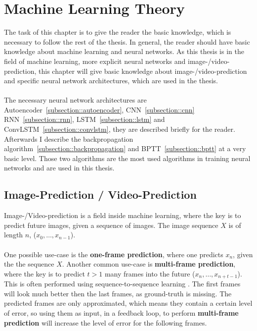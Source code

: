 \section{Machine Learning Theory} \label{section::theory}
 The task of this chapter is to give the reader the basic knowledge, which is necessary to follow the rest of the thesis. In general, the reader should have basic 
 knowledge about machine learning and neural networks.
 As this thesis is in the field of machine learning, more explicit neural networks and image-/video-prediction, this chapter will give basic knowledge about 
 image-/video-prediction
 and specific neural network architectures, which are used in the thesis.\\\\
 The necessary neural network architectures are Autoencoder~\ref{subsection::autoencoder}, CNN~\ref{subsection::cnn} RNN~\ref{subsection::rnn}, 
 LSTM~\ref{subsection::lstm} and ConvLSTM~\ref{subsection::convlstm}, they are described briefly for the reader.
 Afterwards I describe the backpropagation algorithm~\ref{subsection::backpropagation} and BPTT~\ref{subsection::bptt} at a very basic level.
 Those two algorithms are the most used algorithms in training neural networks and are used in this thesis.

 \subsection{Image-Prediction / Video-Prediction} \label{subsection::imageprediction}
  Image-/Video-prediction is a field inside machine learning, where the key is to predict future images, given a sequence of images. The image sequence $X$ is of 
  length $n$, ($x_0, \ldots, x_{n-1}$).
  \\\\
  One possible use-case is the \textbf{one-frame prediction}, where one predicts $x_n$, given the the sequence $X$. Another common use-case is \textbf{multi-frame prediction}, where the key is to 
  predict $t > 1$ many frames into the future ($x_n, \ldots, x_{n+t-1}$).
  This is often performed using sequence-to-sequence learning \cite{Sutskever2014}. The first frames will look much better then the last frames, as 
  ground-truth is missing. The predicted frames are only approximated, which means they contain a certain level of error, so using them as input, in a
  feedback loop, to perform \textbf{multi-frame prediction} will increase the level of error for the following frames.

